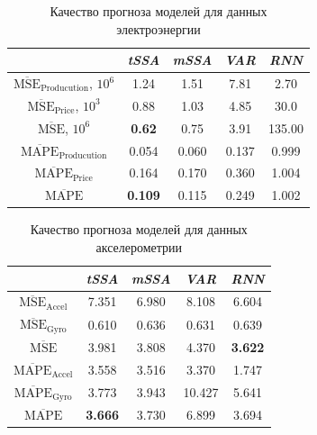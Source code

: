 			\def\arraystretch{1.1}
			\begin{table}[h]
				\centering
				\caption{Качество прогноза моделей для данных электроэнергии}\label{tab:pred_res_electr}
				\begin{tabular}{|c|c|c|c|c|}
					\hline
					& \textit{tSSA}  & \textit{mSSA} & \textit{VAR} & \textit{RNN} \\ \hline
					$ \overline{\text{MSE}}_{\text{Producution}} $, $10^6$ & 1.24           & 1.51          & 7.81         & 2.70         \\ \hline
					$ \overline{\text{MSE}}_{\text{Price}} $, $10^3$      & 0.88           & 1.03          & 4.85         & 30.0         \\ \hline
					$ \overline{\text{MSE}} $, $10^6$             & \textbf{0.62}  & 0.75          & 3.91         & 135.00       \\ \hline
					$ \overline{\text{MAPE}}_{\text{Producution}} $        & 0.054          & 0.060         & 0.137        & 0.999        \\ \hline
					$ \overline{\text{MAPE}}_{\text{Price}} $             & 0.164          & 0.170         & 0.360        & 1.004        \\ \hline
					$ \overline{\text{MAPE}} $                    & \textbf{0.109} & 0.115         & 0.249        & 1.002        \\ \hline
				\end{tabular}
			\end{table}
			
			\def\arraystretch{1.1}
			\begin{table}[h]
				\centering
				\caption{Качество прогноза моделей для данных акселерометрии}\label{tab:pred_res_motion}
				\begin{tabular}{|c|c|c|c|c|}
					\hline
					& \textit{tSSA}                & \textit{mSSA} & \textit{VAR} & \textit{RNN} \\ \hline
					$ \overline{\text{MSE}}_{\text{Accel}} $  & 7.351          & 6.980 & 8.108  & 6.604          \\ \hline
					$ \overline{\text{MSE}}_{\text{Gyro}} $   & 0.610          & 0.636 & 0.631  & 0.639          \\ \hline
					$ \overline{\text{MSE}} $         & 3.981          & 3.808 & 4.370  & \textbf{3.622} \\ \hline
					$ \overline{\text{MAPE}}_{\text{Accel}} $ & 3.558          & 3.516 & 3.370  & 1.747          \\ \hline
					$ \overline{\text{MAPE}}_{\text{Gyro}} $  & 3.773          & 3.943 & 10.427 & 5.641          \\ \hline
					$ \overline{\text{MAPE}} $        & \textbf{3.666} & 3.730 & 6.899  & 3.694          \\ \hline
				\end{tabular}
			\end{table}
			
